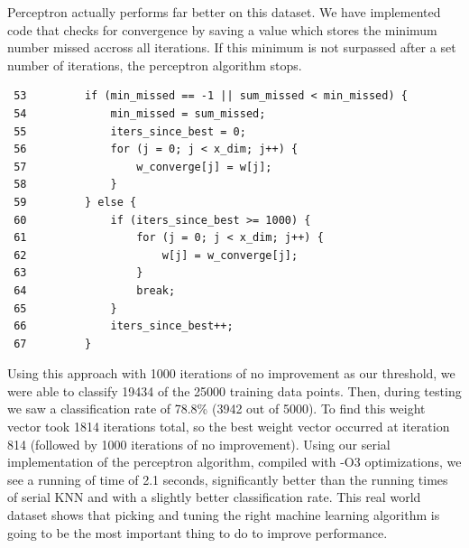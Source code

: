 \documentclass{article}
\begin{document}
Perceptron actually performs far better on this dataset. We have implemented code that checks for convergence by saving a value which stores the minimum number missed accross all iterations. If this minimum is not surpassed after a set number of iterations, the perceptron algorithm stops.
\begin{verbatim}
 53         if (min_missed == -1 || sum_missed < min_missed) {
 54             min_missed = sum_missed;
 55             iters_since_best = 0;
 56             for (j = 0; j < x_dim; j++) {
 57                 w_converge[j] = w[j];
 58             }
 59         } else {
 60             if (iters_since_best >= 1000) {
 61                 for (j = 0; j < x_dim; j++) {
 62                     w[j] = w_converge[j];
 63                 }
 64                 break;
 65             }
 66             iters_since_best++;
 67         }
\end{verbatim}

Using this approach with 1000 iterations of no improvement as our threshold, we were able to classify 19434 of the 25000 training data points. Then, during testing we saw a classification rate of 78.8\% (3942 out of 5000). To find this weight vector took 1814 iterations total, so the best weight vector occurred at iteration 814 (followed by 1000 iterations of no improvement). Using our serial implementation of the perceptron algorithm, compiled with -O3 optimizations, we see a running of time of 2.1 seconds, significantly better than the running times of serial KNN and with a slightly better classification rate. This real world dataset shows that picking and tuning the right machine learning algorithm is going to be the most important thing to do to improve performance.
\end{document}
